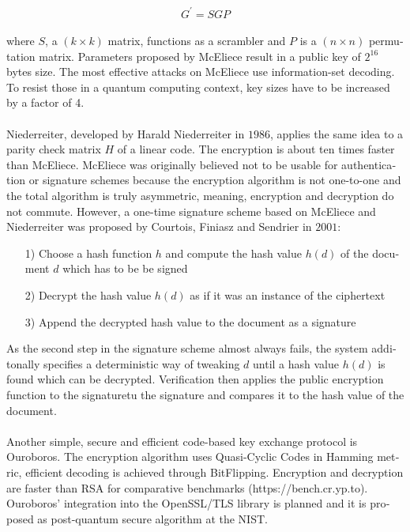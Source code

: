 \documentclass[a4paper,11pt,draft]{article}
\begin{document}
\begin{otherlanguage}{english}
\begin{multicols}{2}
$$ G^\prime = SGP $$
\\
where $S$, a $(k \times k)$ matrix, functions as a scrambler and $P$ is a $(n \times n)$ permutation matrix. Parameters proposed by McEliece result in a public key of $2^{16}$ bytes size. The most effective attacks on McEliece use information-set decoding. To resist those in a quantum computing context, key sizes have to be increased by a factor of 4.\\
\\
Niederreiter, developed by Harald Niederreiter in $1986$, applies the same idea to a parity check matrix $H$ of a linear code. The encryption is about ten times faster than McEliece.  McEliece was originally believed not to be usable for authentication or signature schemes because the encryption algorithm is not one-to-one and the total algorithm is truly asymmetric, meaning, encryption and decryption do not commute. However, a one-time signature scheme based on McEliece and Niederreiter was proposed by Courtois, Finiasz and Sendrier in $2001$: 
 \\

\begin{itemize} [noitemsep, nolistsep]
\item[1)] Choose a hash function $h$  and compute the hash value $h(d)$ of the document $d$ which has to be be signed
\item[2)] Decrypt the hash value $h(d)$ as if it was an instance of the ciphertext
\item[3)] Append the decrypted hash value to the document as a signature
\end{itemize} 

\vspace{0.4cm}
\noindent
As the second step in the signature scheme almost always fails, the system additonally specifies a deterministic way of tweaking $d$ until a hash value $h(d)$ is found which can be decrypted. Verification then applies the public encryption function to the signaturetu the signature and compares it to the hash value of the document. \\
\\
Another simple, secure and efficient code-based key exchange protocol is Ouroboros. The encryption algorithm uses Quasi-Cyclic Codes in Hamming metric, efficient decoding is achieved through BitFlipping. Encryption and decryption are faster than RSA for comparative benchmarks (https://bench.cr.yp.to). Ouroboros' integration into the OpenSSL/TLS library is planned and it is proposed as post-quantum secure algorithm at the NIST.


\end{multicols}
\end{otherlanguage}
\end{document}
